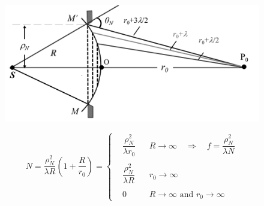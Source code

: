 \begin{figure}[H]
  \centering
  \includegraphics[width=0.7\linewidth]{figures/fresnel.png}
\end{figure}

\begin{equation*}
  N = \dfrac{\rho_N^2}{\lambda R} \left( 1 + \dfrac{R}{r_0}  \right) =
  \left\{
  \begin{aligned}
    & \dfrac{\rho_N^2}{\lambda r_0} && R \rightarrow \infty
    \quad \Rightarrow \quad
    f = \dfrac{\rho_N^2}{\lambda N} \\ 
    \\
    & \dfrac{\rho_N^2}{\lambda R} && r_0 \rightarrow \infty \\
    \\
    & 0 && R \rightarrow \infty \text{ and } r_0 \rightarrow \infty 
  \end{aligned}
  \right.
\end{equation*}




